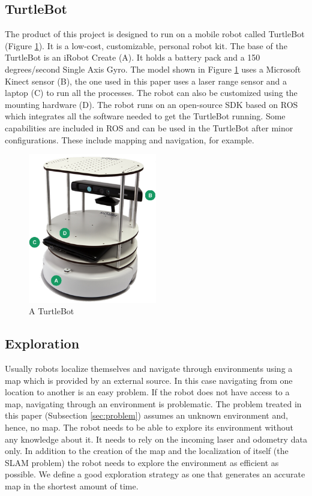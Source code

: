 \documentclass{ba-kecs}
\begin{document}
\subsection{TurtleBot}
\label{subsec:turtle}
The product of this project is designed to run on a mobile robot called TurtleBot (Figure \ref{fig:turtlebot}). It is a low-cost, customizable, personal robot kit. The base of the TurtleBot is an iRobot Create (A). It holds a battery pack and a 150 degrees/second Single Axis Gyro. The model shown in Figure \ref{fig:turtlebot} uses a Microsoft Kinect sensor (B), the one used in this paper uses a laser range sensor and a laptop (C) to run all the processes. The robot can also be customized using the mounting hardware (D). The robot runs on an open-source SDK based on ROS which integrates all the software needed to get the TurtleBot running. Some capabilities are included in ROS and can be used in the TurtleBot after minor configurations. These include mapping and navigation, for example. 
\begin{figure}[h]
	\centering
		\includegraphics[width=0.50\textwidth]{figures/turtlebot.png}
	\caption{A TurtleBot}
	\label{fig:turtlebot}
\end{figure}

\subsection{Exploration}
\label{subsec:sotaExplore}
Usually robots localize themselves and navigate through environments using a map which is provided by an external source. In this case navigating from one location to another is an easy problem. If the robot does not have access to a map, navigating through an environment is problematic. The problem treated in this paper (Subsection \ref{sec:problem}) assumes an unknown environment and, hence, no map. The robot needs to be able to explore its environment without any knowledge about it. It needs to rely on the incoming laser and odometry data only. In addition to the creation of the map and the localization of itself (the SLAM problem) the robot needs to explore the environment as efficient as possible. We define a good exploration strategy as one that generates an accurate map in the shortest amount of time.
\end{document}
